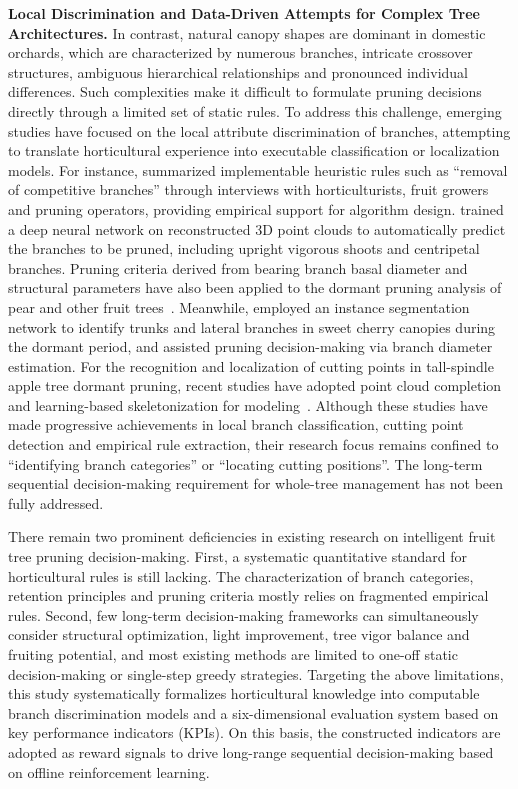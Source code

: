 \documentclass[12pt,a4paper,fontset=fandol]{ctexart}
\begin{document}
\textbf{Local Discrimination and Data-Driven Attempts for Complex Tree Architectures.}
In contrast, natural canopy shapes are dominant in domestic orchards, which are characterized by numerous branches, intricate crossover structures, ambiguous hierarchical relationships and pronounced individual differences.
Such complexities make it difficult to formulate pruning decisions directly through a limited set of static rules.
To address this challenge, emerging studies have focused on the local attribute discrimination of branches, attempting to translate horticultural experience into executable classification or localization models.
For instance, \citet{flynn2024uncovering} summarized implementable heuristic rules such as ``removal of competitive branches'' through interviews with horticulturists, fruit growers and pruning operators, providing empirical support for algorithm design.
\citet{wang2022bp} trained a deep neural network on reconstructed 3D point clouds to automatically predict the branches to be pruned, including upright vigorous shoots and centripetal branches.
Pruning criteria derived from bearing branch basal diameter and structural parameters have also been applied to the dormant pruning analysis of pear and other fruit trees~\citep{kim2025pear,li2025pear}.
Meanwhile, \citet{borrenpohl2023automated} employed an instance segmentation network to identify trunks and lateral branches in sweet cherry canopies during the dormant period, and assisted pruning decision-making via branch diameter estimation.
For the recognition and localization of cutting points in tall-spindle apple tree dormant pruning, recent studies have adopted point cloud completion and learning-based skeletonization for modeling~\citep{liu2025fusion,liu2025unet}.
Although these studies have made progressive achievements in local branch classification, cutting point detection and empirical rule extraction, their research focus remains confined to ``identifying branch categories'' or ``locating cutting positions''.
The long-term sequential decision-making requirement for whole-tree management has not been fully addressed.

There remain two prominent deficiencies in existing research on intelligent fruit tree pruning decision-making.
First, a systematic quantitative standard for horticultural rules is still lacking.
The characterization of branch categories, retention principles and pruning criteria mostly relies on fragmented empirical rules.
Second, few long-term decision-making frameworks can simultaneously consider structural optimization, light improvement, tree vigor balance and fruiting potential, and most existing methods are limited to one-off static decision-making or single-step greedy strategies.
Targeting the above limitations, this study systematically formalizes horticultural knowledge into computable branch discrimination models and a six-dimensional evaluation system based on key performance indicators (KPIs).
On this basis, the constructed indicators are adopted as reward signals to drive long-range sequential decision-making based on offline reinforcement learning.
\end{document}
